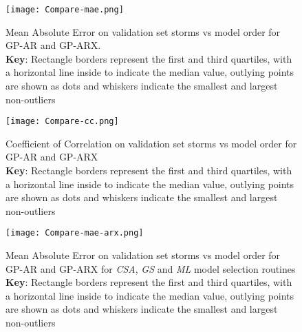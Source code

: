 %


\begin{figure}
    \noindent\texttt{[image: Compare-mae.png]}
    \caption{Mean Absolute Error on validation set storms vs model order for GP-AR and GP-ARX. \\ \textbf{Key}: Rectangle borders represent the first and third quartiles, with a horizontal line inside to indicate the median value, outlying points are shown as dots and whiskers indicate the smallest and largest non-outliers}
    \label{fig:CompareMae}
    \end{figure}
    
    \begin{figure}
    \noindent\texttt{[image: Compare-cc.png]}
    \caption{Coefficient of Correlation on validation set storms vs model order for GP-AR and GP-ARX \\ \textbf{Key}: Rectangle borders represent the first and third quartiles, with a horizontal line inside to indicate the median value, outlying points are shown as dots and whiskers indicate the smallest and largest non-outliers}
    \label{fig:CompareCC}
    \end{figure}
    
    
    \begin{figure}
    \noindent\texttt{[image: Compare-mae-arx.png]}
    \caption{Mean Absolute Error on validation set storms vs model order for GP-AR and GP-ARX for \emph{CSA}, \emph{GS} and \emph{ML} model selection routines \\ \textbf{Key}: Rectangle borders represent the first and third quartiles, with a horizontal line inside to indicate the median value, outlying points are shown as dots and whiskers indicate the smallest and largest non-outliers}
    \label{fig:CompareMaeARX}
    \end{figure}
    
